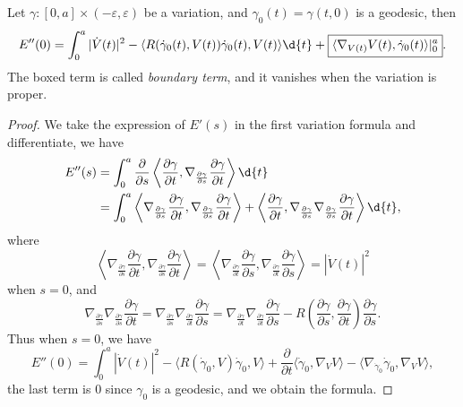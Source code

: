\begin{prop}
    Let $\gamma:[0,a]\times(-\varepsilon,\varepsilon)$ be a variation, and $\gamma_0(t)=\gamma(t,0)$ is a geodesic, then
    \[E''(0)=\int_0^a|\dot{V}(t)|^2-\langle R(\dot\gamma_0(t),V(t))\dot\gamma_0(t),V(t)\rangle\d{t}+\boxed{\langle\nabla_{V(t)}V(t),\dot\gamma_0(t)\rangle|^a_0}.\]
    The boxed term is called \emph{boundary term}, and it vanishes when the variation is proper.
\end{prop}
\begin{proof}
    We take the expression of $E'(s)$ in the first variation formula and differentiate, we have
    \begin{align*}
        E''(s)&=\int_0^a\frac{\partial{}}{\partial{s}}\left\langle\frac{\partial\gamma}{\partial{t}},\nabla_{\frac{\partial\gamma}{\partial{s}}}\frac{\partial\gamma}{\partial{t}}\right\rangle\d{t}\\
        &=\int_0^a\left\langle\nabla_{\frac{\partial\gamma}{\partial{s}}}\frac{\partial\gamma}{\partial{t}},\nabla_{\frac{\partial\gamma}{\partial{s}}}\frac{\partial\gamma}{\partial{t}}\right\rangle+\left\langle\frac{\partial\gamma}{\partial{t}},\nabla_{\frac{\partial\gamma}{\partial{s}}}\nabla_{\frac{\partial\gamma}{\partial{s}}}\frac{\partial\gamma}{\partial{t}}\right\rangle\d{t},
    \end{align*}
    where
    \[\left\langle\nabla_{\frac{\partial\gamma}{\partial{s}}}\frac{\partial\gamma}{\partial{t}},\nabla_{\frac{\partial\gamma}{\partial{s}}}\frac{\partial\gamma}{\partial{t}}\right\rangle=\left\langle\nabla_{\frac{\partial\gamma}{\partial{t}}}\frac{\partial\gamma}{\partial{s}},\nabla_{\frac{\partial\gamma}{\partial{t}}}\frac{\partial\gamma}{\partial{s}}\right\rangle=|\dot{V}(t)|^2\]
    when $s=0$, and
    \[\nabla_{\frac{\partial\gamma}{\partial{s}}}\nabla_{\frac{\partial\gamma}{\partial{s}}}\frac{\partial\gamma}{\partial{t}}=\nabla_{\frac{\partial\gamma}{\partial{s}}}\nabla_{\frac{\partial\gamma}{\partial{t}}}\frac{\partial\gamma}{\partial{s}}=\nabla_{\frac{\partial\gamma}{\partial{t}}}\nabla_{\frac{\partial\gamma}{\partial{t}}}\frac{\partial\gamma}{\partial{s}}-R\left(\frac{\partial\gamma}{\partial{s}},\frac{\partial\gamma}{\partial{t}}\right)\frac{\partial\gamma}{\partial{s}}.\]
    Thus when $s=0$, we have
    \[E''(0)=\int_0^a|\dot{V}(t)|^2-\langle R(\dot\gamma_0,V)\dot\gamma_0,V\rangle+\frac{\partial}{\partial{t}}\langle\dot\gamma_0,\nabla_VV\rangle-\langle\nabla_{\dot\gamma_0}\dot\gamma_0,\nabla_VV\rangle,\]
    the last term is $0$ since $\gamma_0$ is a geodesic, and we obtain the formula.
\end{proof}

